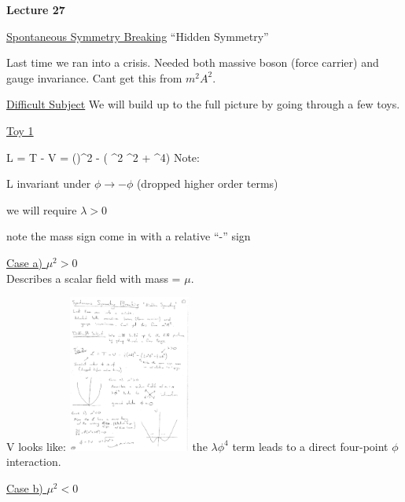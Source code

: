 



\thispagestyle{fancy}

\begin{center}
{\huge \textbf{Lecture 27}}
\end{center}

{\fontsize{14}{16}\selectfont

\underline{\underline{Spontaneous Symmetry Breaking}}  ``Hidden Symmetry''

Last time we ran into a crisis. 
Needed both massive boson (force carrier) and gauge invariance.  
Cant get this from $m^2A^2$.


\underline{\underline{Difficult Subject}}  We will build up to the full picture by going through a few toys.

\underline{Toy 1}  

\be
L = T - V = (\partial \phi)^2 - \left( \mu^2 \phi^2 +  \lambda \phi^4\right)
\ee
Note:
\bi
\item[-] L invariant under $\phi \rightarrow  -\phi$  (dropped higher order terms)
\item[-] we will require $\lambda > 0 $
\item[-] note the mass sign come in with a relative ``-'' sign
\ei

\underline{Case a) $\mu^2 > 0$}\\
Describes a scalar field with mass = $\mu$.  

V looks like:
\bc
\includegraphics[width=0.3\textwidth]{./V_mu2positive.pdf}
\ec
the $\lambda \phi^4$ term leads to a direct four-point $\phi$ interaction.

\clearpage

\underline{Case b) $\mu^2 < 0$}\\

}
